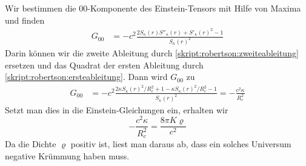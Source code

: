 Wir bestimmen die $00$-Komponente des Einstein-Tensors mit Hilfe
von Maxima und finden
\begin{align*}
G_{00}
&=
-c^2\frac{ 2S_\kappa(r)S''_\kappa(r) + S'_\kappa(r)^2-1 }{S_\kappa(r)^2}
\end{align*}
Darin können wir die zweite Ableitung durch
\eqref{skript:robertson:zweiteableitung}
ersetzen und das Quadrat der ersten Ableitung durch
\eqref{skript:robertson:ersteableitung}.
Dann wird $G_{00}$ zu
\begin{align*}
G_{00}
&=
-c^2\frac{2\kappa S_\kappa(r)^2/R_c^2 + 1-\kappa S_\kappa(r)^2/R_c^2-1 }{S_\kappa(r)^2}
=
-\frac{c^2\kappa}{R_c^2}
\end{align*}
Setzt man dies in die Einstein-Gleichungen ein, erhalten wir
\begin{equation}
-\frac{c^2\kappa}{R_c^2}=\frac{8\pi K\varrho}{c^2}
\end{equation}
Da die Dichte $\varrho$ positiv ist, liest man daraus ab, dass ein solches
Universum negative Krümmung haben muss.


